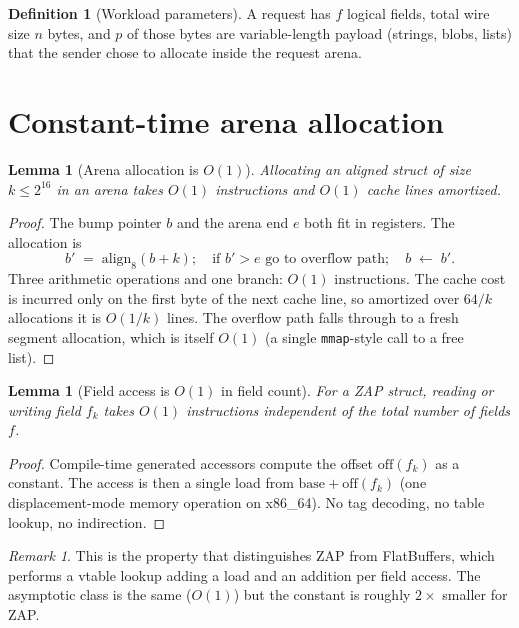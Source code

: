\documentclass[11pt]{article}
\newtheorem{lemma}[theorem]{Lemma}
\theoremstyle{definition}
\newtheorem{definition}[theorem]{Definition}
\theoremstyle{remark}
\newtheorem*{remark}{Remark}
\begin{document}
\begin{definition}[Workload parameters]
A request has $f$ logical fields, total wire size $n$ bytes, and $p$
of those bytes are variable-length payload (strings, blobs, lists)
that the sender chose to allocate inside the request arena.
\end{definition}

\section{Constant-time arena allocation}
\label{sec:arena}

\begin{lemma}[Arena allocation is $O(1)$]
\label{lem:arena}
Allocating an aligned struct of size $k \leq 2^{16}$ in an arena
takes $O(1)$ instructions and $O(1)$ cache lines amortized.
\end{lemma}

\begin{proof}
The bump pointer $b$ and the arena end $e$ both fit in registers.
The allocation is
\[
  b' \;=\; \mathrm{align}_8(b + k);\quad
  \text{if } b' > e \text{ go to overflow path};\quad
  b \;\leftarrow\; b'.
\]
Three arithmetic operations and one branch: $O(1)$ instructions.
The cache cost is incurred only on the first byte of the next cache
line, so amortized over $64/k$ allocations it is $O(1/k)$ lines.
The overflow path falls through to a fresh segment allocation, which
is itself $O(1)$ (a single \texttt{mmap}-style call to a free list).
\end{proof}

\begin{lemma}[Field access is $O(1)$ in field count]
\label{lem:fieldaccess}
For a ZAP struct, reading or writing field $f_k$ takes $O(1)$
instructions independent of the total number of fields $f$.
\end{lemma}

\begin{proof}
Compile-time generated accessors compute the offset $\mathrm{off}(f_k)$
as a constant. The access is then a single load from
$\mathrm{base} + \mathrm{off}(f_k)$ (one displacement-mode memory
operation on x86\_64). No tag decoding, no table lookup, no
indirection.
\end{proof}

\begin{remark}
This is the property that distinguishes ZAP from FlatBuffers, which
performs a vtable lookup adding a load and an addition per field
access. The asymptotic class is the same ($O(1)$) but the constant
is roughly $2\times$ smaller for ZAP.
\end{remark}
\end{document}
